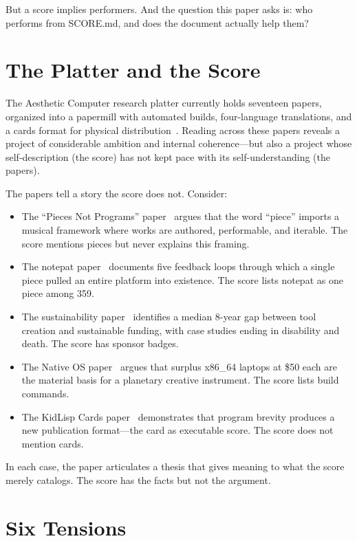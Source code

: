 \documentclass[10pt,letterpaper,twocolumn]{article}
\begin{document}
But a score implies performers. And the question this paper asks is: who performs from SCORE.md, and does the document actually help them?

\section{The Platter and the Score}

The Aesthetic Computer research platter currently holds seventeen papers, organized into a papermill with automated builds, four-language translations, and a cards format for physical distribution~\citep{scudder2026cards}. Reading across these papers reveals a project of considerable ambition and internal coherence---but also a project whose self-description (the score) has not kept pace with its self-understanding (the papers).

The papers tell a story the score does not. Consider:

\begin{itemize}
\item The ``Pieces Not Programs'' paper~\citep{scudder2026pieces} argues that the word ``piece'' imports a musical framework where works are authored, performable, and iterable. The score mentions pieces but never explains this framing.
\item The notepat paper~\citep{scudder2026notepat} documents five feedback loops through which a single piece pulled an entire platform into existence. The score lists notepat as one piece among 359.
\item The sustainability paper~\citep{scudder2026sustainability} identifies a median 8-year gap between tool creation and sustainable funding, with case studies ending in disability and death. The score has sponsor badges.
\item The Native OS paper~\citep{scudder2026os} argues that surplus x86\_64 laptops at \$50 each are the material basis for a planetary creative instrument. The score lists build commands.
\item The KidLisp Cards paper~\citep{scudder2026cards} demonstrates that program brevity produces a new publication format---the card as executable score. The score does not mention cards.
\end{itemize}

In each case, the paper articulates a thesis that gives meaning to what the score merely catalogs. The score has the facts but not the argument.

\section{Six Tensions}
\end{document}
